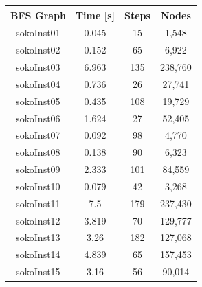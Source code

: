 \documentclass[a4paper,10pt]{article}
\begin{document}
			\begin{tabular}{|c||c|c|c|}
				\hline 
				\textbf{BFS Graph} & \textbf{Time [s]} & \textbf{Steps} & \textbf{Nodes} \\ 
				\hline 
				sokoInst01 & 0.045 & 15 & 1,548 \\ 
				\hline 
				sokoInst02 & 0.152 & 65 & 6,922 \\ 
				\hline 
				sokoInst03 & 6.963 & 135 & 238,760 \\ 
				\hline 
				sokoInst04 & 0.736 & 26 & 27,741 \\ 
				\hline 
				sokoInst05 & 0.435 & 108 & 19,729 \\ 
				\hline 
				sokoInst06 & 1.624 & 27 & 52,405 \\ 
				\hline 
				sokoInst07 & 0.092 & 98 & 4,770 \\ 
				\hline 
				sokoInst08 & 0.138 & 90 & 6,323 \\ 
				\hline 
				sokoInst09 & 2.333 & 101 & 84,559 \\ 
				\hline
				sokoInst10 & 0.079 & 42 & 3,268 \\ 
				\hline 
				sokoInst11 & 7.5 & 179 & 237,430 \\ 
				\hline
				sokoInst12 & 3.819 & 70 & 129,777 \\ 
				\hline
				sokoInst13 & 3.26 & 182 & 127,068 \\ 
				\hline
				sokoInst14 & 4.839 & 65 & 157,453 \\ 
				\hline
				sokoInst15 & 3.16 & 56 & 90,014 \\ 
				\hline
			\end{tabular}\\
			
\end{document}
